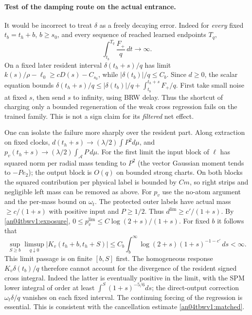 \documentclass[11pt]{article}
\begin{document}
\paragraph{Test of the damping route on the actual entrance.}
It would be incorrect to treat $\delta$ as a freely decaying error.
Indeed for \emph{every} fixed $t_b=t_h+b$, $b\ge s_0$, and every
sequence of reached learned endpoints $T_q$,
\begin{equation}\label{an04tbwv1:false}
 \int_{t_b}^{T_q}\frac{F_+}{q}\,dt\longrightarrow\infty .
\end{equation}
On a fixed later resident interval $\delta(t_h+s)/q$ has limit
$k(s)/\rho-\ell_0\ge cD(s)-C_{s_0}$, while $|\delta(t_b)|/q\le C_b$.
Since $d\ge0$, the scalar equation bounds
$\delta(t_h+s)/q\le|\delta(t_b)|/q+\int_{t_b}^{t_h+s} F_+/q$.
First take small noise at fixed $s$, then send $s$ to infinity,
using BRW delay. Thus the shortcut of charging only a bounded
regeneration of the weak cross regression fails on the trained
family. This is not a sign claim for its \emph{filtered} net effect.

One can isolate the failure more sharply over the resident part.
Along extraction on fixed clocks, $d(t_h+s)\to
(\lambda/2)\int P^2 d\mu$, and $p_v(t_h+s)\to
(\lambda/2)\int_{\mathcal A}P\,d\mu$. For the first limit the input
block of $\ell$ has squared norm per radial mass tending to $P^2$
(the vector Gaussian moment tends to $-P e_2$); the output block
is $O(q)$ on bounded strong charts. On both blocks the squared
contribution per physical label is bounded by $C m$, so right strips
and negligible left mass can be removed as above. For $p_v$ use
the no-atom argument and the per-mass bound on $\omega_t$.
The protected outer labels have actual mass $\ge c/(1+s)$ with
positive input and $P\ge1/2$. Thus $d^{\lim}\ge c'/(1+s)$.
By \eqref{an04tbwv1:exposure}, $0\le p_v^{\lim}\le
C\log(2+s)/(1+s)$. For fixed $b$ it follows that
\[
 \sup_{S\ge b}\limsup_{q\downarrow0}|K_v(t_h+b,t_h+S)|
 \le C_b\int_b^\infty\log(2+s)(1+s)^{-1-c'}\,ds<\infty .
\]
This limit passage is on finite $[b,S]$ first. The homogeneous
response $K_v\delta(t_b)/q$ therefore cannot account for the
divergence of the resident signed cross integral. Indeed the latter
is eventually positive in the limit, with the SPM lower integral
of order at least $\int^S (1+s)^{-5/6}ds$; the direct-output
correction $\omega_t\delta/q$ vanishes on each fixed interval.
The continuing forcing of the regression is essential. This is
consistent with the cancellation estimate \eqref{an04tbwv1:matched}.
\end{document}
